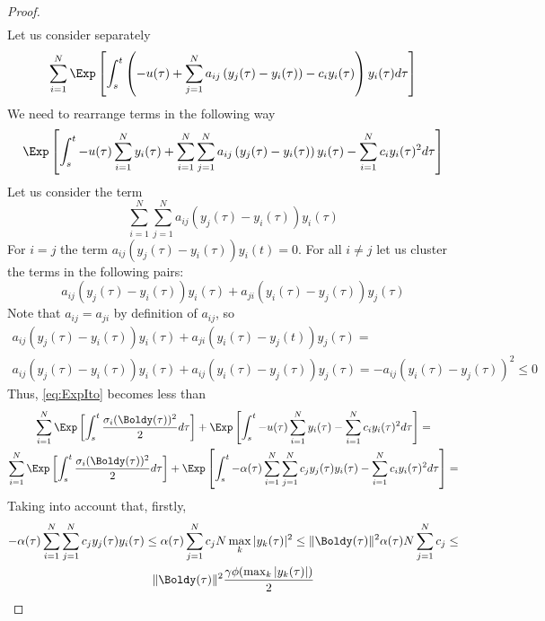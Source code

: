 \begin{proof}
\begin{multline}
    \end{multline}
    Let us consider separately
    \[
        \sum_{i=1}^N \Exp \left[\int_s^t \left(-u(\tau) + \sum_{j=1}^N a_{i j}\left(y_j(\tau)-y_i(\tau)\right)-c_i y_i(\tau)\right) y_i(\tau) d\tau \right]
    \]
    We need to rearrange terms in the following way
    \begin{equation}
        \Exp \left[\int_s^t - u(\tau) \sum_{i=1}^N y_i(\tau) + \sum_{i=1}^N \sum_{j=1}^N a_{i j}\left(y_j(\tau)-y_i(\tau)\right)y_i(\tau)- \sum_{i=1}^N c_i y_i(\tau)^2 d\tau \right]
    \end{equation}
    Let us consider the term
    \[
        \sum_{i=1}^N \sum_{j=1}^N a_{i j}\left(y_j(\tau)-y_i(\tau)\right)y_i(\tau)
    \]
    For $i = j$ the term $a_{i j}\left(y_j(\tau)-y_i(\tau)\right)y_i(t) = 0$. For all $i \neq j$ let us cluster the terms in the following pairs:
    \[
         a_{i j}\left(y_j(\tau)-y_i(\tau)\right)y_i(\tau) + a_{j i}\left(y_i(\tau)-y_j(\tau)\right)y_j(\tau) 
    \]
    Note that $a_{ij} = a_{ji}$ by definition of $a_{ij}$, so 
    \begin{multline*}
        a_{i j}\left(y_j(\tau)-y_i(\tau)\right)y_i(\tau) + a_{j i}\left(y_i(\tau)-y_j(t)\right)y_j(\tau)  = \\ 
         a_{i j}\left(y_j(\tau)-y_i(\tau)\right)y_i(\tau) + a_{i j }\left(y_i(\tau)-y_j(\tau)\right)y_j(\tau) = 
         - a_{i j} (y_i(\tau) - y_j(\tau)) ^ 2 \leq 0
    \end{multline*}
    Thus, \eqref{eq:ExpIto} becomes less than 
    \begin{multline*}
        \sum_{i=1}^N \Exp \left[ \int_s^{t} \frac{\sigma_i(\Boldy(\tau))^2}{2} d\tau\right]  +  \Exp \left[\int_s^t - u(\tau) \sum_{i=1}^N y_i(\tau) - \sum_{i=1}^N c_i y_i(\tau)^2 d\tau \right] =  \\ 
        \sum_{i=1}^N \Exp \left[ \int_s^{t} \frac{\sigma_i(\Boldy(\tau))^2}{2} d\tau\right]  +  \Exp \left[\int_s^t - \alpha(\tau) \sum_{i=1}^N \sum_{j=1}^N c_j y_j(\tau) y_i(\tau) - \sum_{i=1}^N c_i y_i(\tau)^2 d\tau \right] = 
    \end{multline*}
    Taking into account that, firstly,
    \begin{multline*}
        -\alpha(\tau) \sum_{i=1}^N \sum_{j=1}^N c_j y_j(\tau) y_i(\tau) \leq \alpha(\tau) \sum_{j=1}^N  c_j N \max_k |y_k(\tau)|^2  \leq  
        \|\Boldy(\tau)\|^2 \alpha(\tau) N \sum_{j=1}^N c_j \leq \\  \|\Boldy(\tau)\|^2  \frac{\gamma \phi(\max_k|y_k(\tau)|)}{2}
    \end{multline*}

\end{proof}
